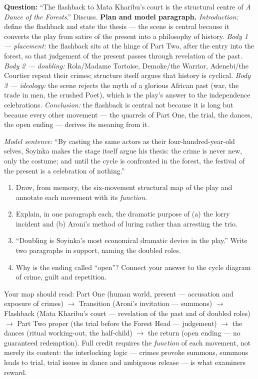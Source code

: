 \documentclass[11pt]{article}
\begin{document}
\begin{exoresolu}
\textbf{Question:} ``The flashback to Mata Kharibu's court is the structural centre of \emph{A Dance of the Forests}.'' Discuss.
\tcblower
\textbf{Plan and model paragraph.} \emph{Introduction:} define the flashback and state the thesis — the scene is central because it converts the play from satire of the present into a philosophy of history. \emph{Body 1 — placement:} the flashback sits at the hinge of Part Two, after the entry into the forest, so that judgement of the present passes through revelation of the past. \emph{Body 2 — doubling:} Rola/Madame Tortoise, Demoke/the Warrior, Adenebi/the Courtier repeat their crimes; structure itself argues that history is cyclical. \emph{Body 3 — ideology:} the scene rejects the myth of a glorious African past (war, the trade in men, the crushed Poet), which is the play's answer to the independence celebrations. \emph{Conclusion:} the flashback is central not because it is long but because every other movement — the quarrels of Part One, the trial, the dances, the open ending — derives its meaning from it.

\emph{Model sentence:} ``By casting the same actors as their four-hundred-year-old selves, Soyinka makes the stage itself argue his thesis: the crime is never new, only the costume; and until the cycle is confronted in the forest, the festival of the present is a celebration of nothing.''
\end{exoresolu}

\begin{exercice}[Consolidation]
\begin{enumerate}
\item Draw, from memory, the six-movement structural map of the play and annotate each movement with its \emph{function}.
\item Explain, in one paragraph each, the dramatic purpose of (a) the lorry incident and (b) Aroni's method of luring rather than arresting the trio.
\item ``Doubling is Soyinka's most economical dramatic device in the play.'' Write two paragraphs in support, naming the doubled roles.
\item Why is the ending called ``open''? Connect your answer to the cycle diagram of crime, guilt and repetition.
\end{enumerate}
\end{exercice}

\begin{corrige}[Exercise 1]
Your map should read: Part One (human world, present — accusation and exposure of crimes) $\rightarrow$ Transition (Aroni's invitation — summons) $\rightarrow$ Flashback (Mata Kharibu's court — revelation of the past and of doubled roles) $\rightarrow$ Part Two proper (the trial before the Forest Head — judgement) $\rightarrow$ the dances (ritual working-out, the half-child) $\rightarrow$ the return (open ending — no guaranteed redemption). Full credit requires the \emph{function} of each movement, not merely its content: the interlocking logic — crimes provoke summons, summons leads to trial, trial issues in dance and ambiguous release — is what examiners reward.
\end{corrige}
\end{document}
